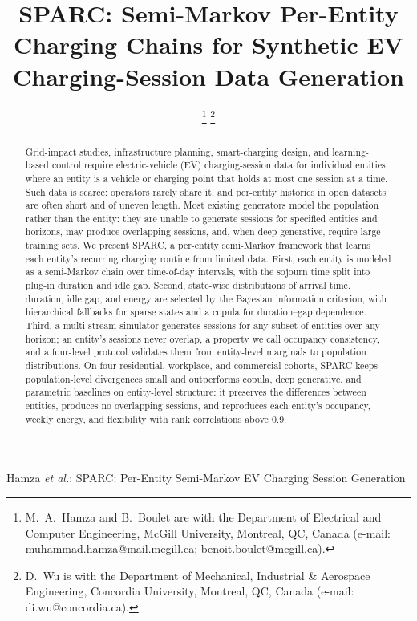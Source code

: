 \documentclass[journal]{IEEEtran}
\begin{document}
\title{SPARC: Semi-Markov Per-Entity Charging Chains for Synthetic EV Charging-Session Data Generation}
\author{
\thanks{M.~A.~Hamza and B.~Boulet are with the Department of Electrical and Computer Engineering, McGill University, Montreal, QC, Canada (e-mail: muhammad.hamza@mail.mcgill.ca; benoit.boulet@mcgill.ca).}%
\thanks{D.~Wu is with the Department of Mechanical, Industrial \& Aerospace Engineering, Concordia University, Montreal, QC, Canada (e-mail: di.wu@concordia.ca).}}

%
{Hamza \MakeLowercase{\textit{et al.}}: SPARC: Per-Entity Semi-Markov EV Charging Session Generation}

\maketitle

\begin{abstract}
Grid-impact studies, infrastructure planning, smart-charging design, and learning-based control require electric-vehicle (EV) charging-session data for individual entities, where an entity is a vehicle or charging point that holds at most one session at a time. Such data is scarce: operators rarely share it, and per-entity histories in open datasets are often short and of uneven length. Most existing generators model the population rather than the entity: they are unable to generate sessions for specified entities and horizons, may produce overlapping sessions, and, when deep generative, require large training sets. We present SPARC, a per-entity semi-Markov framework that learns each entity's recurring charging routine from limited data. First, each entity is modeled as a semi-Markov chain over time-of-day intervals, with the sojourn time split into plug-in duration and idle gap. Second, state-wise distributions of arrival time, duration, idle gap, and energy are selected by the Bayesian information criterion, with hierarchical fallbacks for sparse states and a copula for duration--gap dependence. Third, a multi-stream simulator generates sessions for any subset of entities over any horizon; an entity's sessions never overlap, a property we call occupancy consistency, and a four-level protocol validates them from entity-level marginals to population distributions. On four residential, workplace, and commercial cohorts, SPARC keeps population-level divergences small and outperforms copula, deep generative, and parametric baselines on entity-level structure: it preserves the differences between entities, produces no overlapping sessions, and reproduces each entity's occupancy, weekly energy, and flexibility with rank correlations above $0.9$.
\end{abstract}
\end{document}
